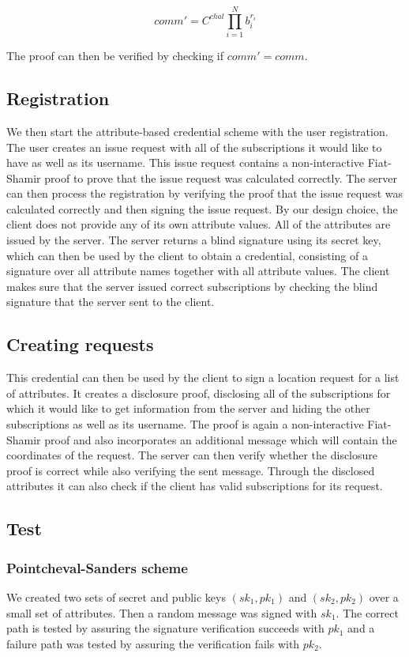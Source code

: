 \documentclass[9pt,conference]{IEEEtran}
\begin{document}
$${comm' = C ^ {chal} \prod_{i=1}^N b_i ^ {r_i}}$$

The proof can then be verified by checking if $comm' = comm$.

\subsection{Registration}
We then start the attribute-based credential scheme with the user registration. The user creates an issue request with all of the subscriptions it would like to have as well as its username. This issue request contains a non-interactive Fiat-Shamir proof to prove that the issue request was calculated correctly. The server can then process the registration by verifying the proof that the issue request was calculated correctly and then signing the issue request. By our design choice, the client does not provide any of its own attribute values. All of the attributes are issued by the server. The server returns a blind signature using its secret key, which can then be used by the client to obtain a credential, consisting of a signature over all attribute names together with all attribute values. The client makes sure that the server issued correct subscriptions by checking the blind signature that the server sent to the client.

\subsection{Creating requests}
This credential can then be used by the client to sign a location request for a list of attributes. It creates a disclosure proof, disclosing all of the subscriptions for which it would like to get information from the server and hiding the other subscriptions as well as its username. The proof is again a non-interactive Fiat-Shamir proof and also incorporates an additional message which will contain the coordinates of the request. The server can then verify whether the disclosure proof is correct while also verifying the sent message. Through the disclosed attributes it can also check if the client has valid subscriptions for its request. 

\subsection{Test}
\subsubsection{Pointcheval-Sanders scheme}
We created two sets of secret and public keys $(sk_1, pk_1)$ and $(sk_2, pk_2)$ over a small set of attributes. Then a random message was signed with $sk_1$. The correct path is tested by assuring the signature verification succeeds with $pk_1$ and a failure path was tested by assuring the verification fails with $pk_2$.
\end{document}
